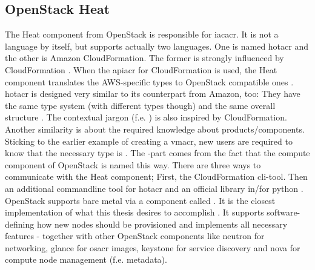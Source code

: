 \subsection{OpenStack Heat}
The Heat component from OpenStack is responsible for \gls{iacacr}. It is not a language by itself, but supports actually two languages. One is named \gls{hotacr} and the other is Amazon CloudFormation. The former is strongly influenced by CloudFormation \cite{openstack_heat_template_guide}. When the \gls{apiacr} for CloudFormation is used, the Heat component translates the AWS-specific types to OpenStack compatible ones \cite{openstack_heat_architecture}.
\newline
\Gls{hotacr} is designed very similar to its counterpart from Amazon, too: They have the same type system (with different types though) and the same overall structure \cite{openstack_heat_architecture}. The contextual jargon (f.e. ) is also inspired by CloudFormation.
\newline
Another similarity is about the required knowledge about products/components. Sticking to the earlier example of creating a \gls{vmacr}, new users are required to know that the necessary type is . The -part comes from the fact that the compute component of OpenStack is named this way.
\newline
There are three ways to communicate with the Heat component; First, the CloudFormation cli-tool. Then an additional commandline tool for \gls{hotacr} \cite{openstack_cli_heat} and an official library in/for python \cite{openstack_python_heat}.
\newline
OpenStack supports bare metal via a component called  \cite{openstack_ironic_architecture}. It is the closest implementation of what this thesis desires to accomplish \cite{redhat_bare_metal}. It supports software-defining how new nodes should be provisioned and implements all necessary features - together with other OpenStack components like neutron for networking, glance for \gls{osacr} images, keystone for service discovery and nova for compute node management (f.e. metadata).


